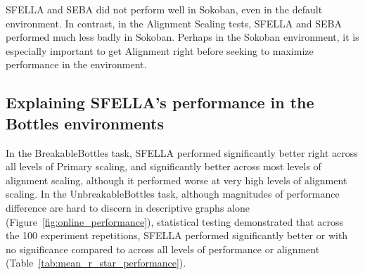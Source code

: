 SFELLA and SEBA did not perform well in Sokoban, even in the default environment. In contrast, in the Alignment Scaling tests, SFELLA and SEBA performed much less badly in Sokoban. Perhaps in the Sokoban environment, it is especially important to get Alignment right before seeking to maximize performance in the environment.

\subsection{Explaining SFELLA's performance in the Bottles environments}


In the BreakableBottles task, SFELLA performed significantly better right across all levels of Primary scaling, and significantly better across most levels of alignment scaling, although it performed worse at very high levels of alignment scaling. In the UnbreakableBottles task, although magnitudes of performance difference are hard to discern in descriptive graphs alone (Figure~\ref{fig:online_performance}), statistical testing demonstrated that across the 100 experiment repetitions, SFELLA performed significantly better or with no significance compared to  \tloA{} across all levels of performance or alignment (Table~\ref{tab:mean_r_star_performance}).



